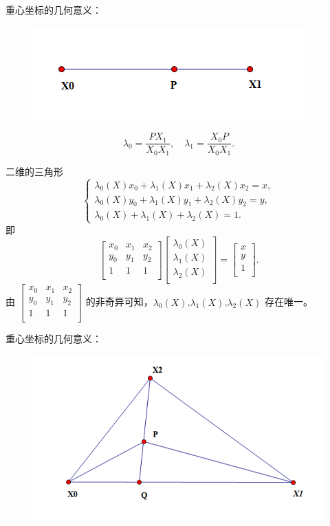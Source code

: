 \documentclass[12pt,a4paper]{article}
\begin{document}
重心坐标的几何意义：

\begin{figure}[H]
\centering
\includegraphics[scale=0.7]{./figures/1.png}
\caption{}
\end{figure}

$$\lambda _0 =\frac{PX_1}{X_0 X_1},\quad \lambda _1 =\frac{X_0 P}{X_0 X_1}.$$

二维的三角形
$$
\begin{cases}
\lambda _0(X)x_0+\lambda _1(X)x_1+\lambda _2(X)x_2=x,\\
\lambda _0(X)y_0+\lambda _1(X)y_1+\lambda _2(X)y_2=y,\\
\lambda _0(X)+\lambda _1(X)+\lambda _2(X)=1.
\end{cases}
$$
即
$$
\begin{bmatrix}
x_0 & x_1 & x_2\\
y_0 & y_1 & y_2\\
1 & 1 & 1\\
\end{bmatrix}
\begin{bmatrix}
\lambda _0(X)\\
\lambda _1(X)\\
\lambda _2(X)\\
\end{bmatrix}=\begin{bmatrix}
x\\
y\\
1\\
\end{bmatrix}.
$$
由 $\begin{bmatrix}
x_0 & x_1 & x_2\\
y_0 & y_1 & y_2\\
1 & 1 & 1\\
\end{bmatrix}$ 的非奇异可知，$\lambda _0(X)$,$\lambda _1(X)$,$\lambda _2(X)$ 存在唯一。

重心坐标的几何意义：

\begin{figure}[H]
\centering
\includegraphics[scale=0.7]{./figures/2.png}
\caption{}
\end{figure}
\end{document}
